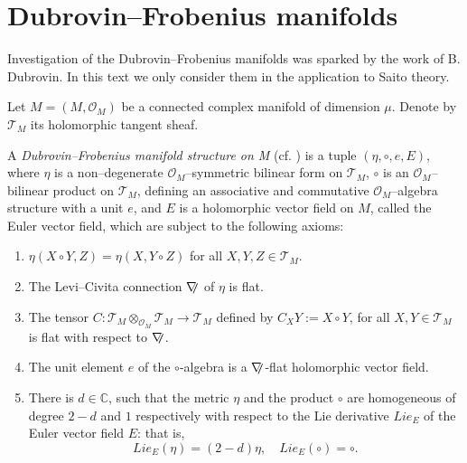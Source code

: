\documentclass[12pt,a4paper]{amsart}
\newcommand{\CC}{{\mathbb{C}}}
\def\O{{\mathcal O}}
\def\T{{\mathcal T}}
\newcommand{\<}{\left<}
\renewcommand{\>}{\right>}
\def\ns{{\nabla}\hspace{-1.2mm}{\text{\footnotesize{\bf /}}}}
\numberwithin{equation}{section}
\begin{document}
\section{Dubrovin--Frobenius manifolds}

Investigation of the Dubrovin--Frobenius manifolds was sparked by the work of B. Dubrovin. In this text we only consider them in the application to Saito theory.

Let $M=(M,\O_{M})$ be a connected complex manifold of dimension $\mu$. Denote by $\T_{M}$ its holomorphic tangent sheaf.
%

%
A {\it Dubrovin--Frobenius manifold structure on M} (cf. \cite{D1,D2}) is a tuple $(\eta, \circ , e,E)$, where $\eta$ is a non--degenerate $\O_{M}$--symmetric bilinear form on $\T_{M}$, $\circ $ is an $\O_{M}$--bilinear product on $\T_{M}$, defining an associative and commutative $\O_{M}$--algebra structure with a unit $e$, and $E$ is a holomorphic vector field on $M$, called the Euler vector field, which are subject to the following axioms:
\begin{enumerate}
\item $ \eta(X\circ Y,Z)=\eta(X,Y\circ Z)$ for all $X,Y,Z \in\T_M$.
\item The {\rm Levi}--{\rm Civita} connection $\ns$ of $\eta$ is flat.
\item The tensor $C:\T_M\otimes_{\O_M}\T_M\to \T_M$  defined by
$C_X Y := X\circ Y$, for all $X,Y\in\T_M$ is flat with respect to $\ns$.
\item The unit element $e$ of the $\circ $-algebra is a
$\ns$-flat holomorphic vector field.

\item There is $d\in\CC$, such that the metric $\eta$ and the product $\circ$ are homogeneous of degree $2-d$ and $1$ respectively with respect to the Lie derivative
$Lie_{E}$ of the {\rm Euler} vector field $E$: that is,
\begin{equation*}
Lie_E(\eta)=(2-d)\eta,\quad Lie_E(\circ)=\circ.
\end{equation*}
\end{enumerate}
\end{document}
